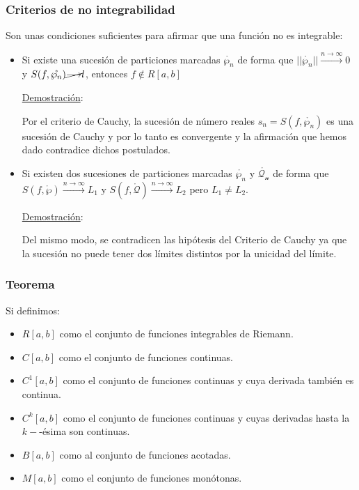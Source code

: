 \documentclass[10pt,a4paper,openright]{book}
\begin{document}
\subsubsection*{Criterios de no integrabilidad}
Son unas condiciones suficientes para afirmar que una función no es integrable:
\begin{itemize}
\item Si existe una sucesión de particiones marcadas $\mathring{\wp_n}$ de forma que $||\mathring{\wp_n}||\xrightarrow{n\rightarrow \infty} 0 $ y $S(f,\mathring{\wp_n})\cancel{\longrightarrow} l$, entonces $f\notin R[a,b]$

\underline{Demostración}:

Por el criterio de Cauchy, la sucesión de número reales $s_n = S(f,\mathring{\wp_n})$ es una sucesión de Cauchy y por lo tanto es convergente y la afirmación que hemos dado contradice dichos postulados.

\item Si existen dos sucesiones de particiones marcadas $\mathring{\wp_n}$ y $\mathring{\mathcal{Q_n}}$ de forma que $S(f,\mathring{\wp})\xrightarrow{n\rightarrow \infty} L_1$ y $S(f,\mathring{\mathcal{Q}})\xrightarrow{n\rightarrow \infty} L_2$ pero $L_1\neq L_2$.

\underline{Demostración}:

Del mismo modo, se contradicen las hipótesis del Criterio de Cauchy ya que la sucesión no puede tener dos límites distintos por la unicidad del límite.
\end{itemize}

\subsubsection*{Teorema}
Si definimos:
\begin{itemize}
\item $R[a,b]$ como el conjunto de funciones integrables de Riemann.
\item $C[a,b]$ como el conjunto de funciones continuas.
\item $C^{1}[a,b]$ como el conjunto de funciones continuas y cuya derivada también es continua.
\item $C^{k}[a,b]$ como el conjunto de funciones continuas y cuyas derivadas hasta la $k-$-ésima son continuas.
\item $B[a,b]$ como al conjunto de funciones acotadas.
\item $M[a,b]$ como el conjunto de funciones monótonas.
\end{itemize}
\end{document}
